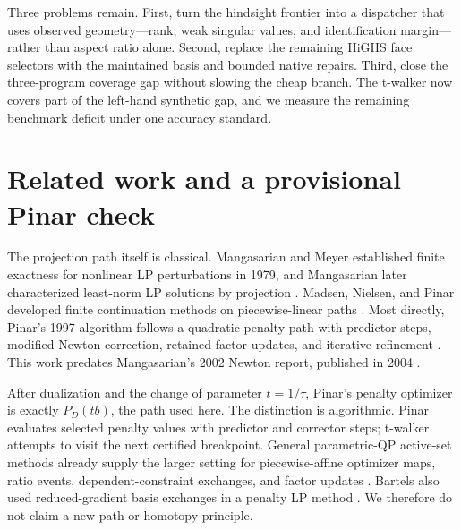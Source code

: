 \documentclass[11pt]{article}
\begin{document}
Three problems remain. First, turn the hindsight frontier into a dispatcher that uses observed geometry---rank, weak singular values, and identification margin---rather than aspect ratio alone. Second, replace the remaining HiGHS face selectors with the maintained basis and bounded native repairs. Third, close the three-program coverage gap without slowing the cheap branch. The t-walker now covers part of the left-hand synthetic gap, and we measure the remaining benchmark deficit under one accuracy standard.

\clearpage
\section{Related work and a provisional Pinar check}

The projection path itself is classical. Mangasarian and Meyer established finite exactness for nonlinear LP perturbations in 1979, and Mangasarian later characterized least-norm LP solutions by projection \citep{mangasarian-meyer-1979,mangasarian-1984}. Madsen, Nielsen, and Pinar developed finite continuation methods on piecewise-linear paths \citep{madsen-nielsen-pinar-1996,pinar-1996}. Most directly, Pinar's 1997 algorithm follows a quadratic-penalty path with predictor steps, modified-Newton correction, retained factor updates, and iterative refinement \citep{pinar-1997}. This work predates Mangasarian's 2002 Newton report, published in 2004 \citep{mangasarian-2004,kline-fung-2023}.

After dualization and the change of parameter $t=1/\tau$, Pinar's penalty optimizer is exactly $P_D(tb)$, the path used here. The distinction is algorithmic. Pinar evaluates selected penalty values with predictor and corrector steps; t-walker attempts to visit the next certified breakpoint. General parametric-QP active-set methods already supply the larger setting for piecewise-affine optimizer maps, ratio events, dependent-constraint exchanges, and factor updates \citep{best-1996,bock-kirches-potschka-schloeder-2010,ferreau-etal-2014}. Bartels also used reduced-gradient basis exchanges in a penalty LP method \citep{bartels-1980}. We therefore do not claim a new path or homotopy principle.
\end{document}
